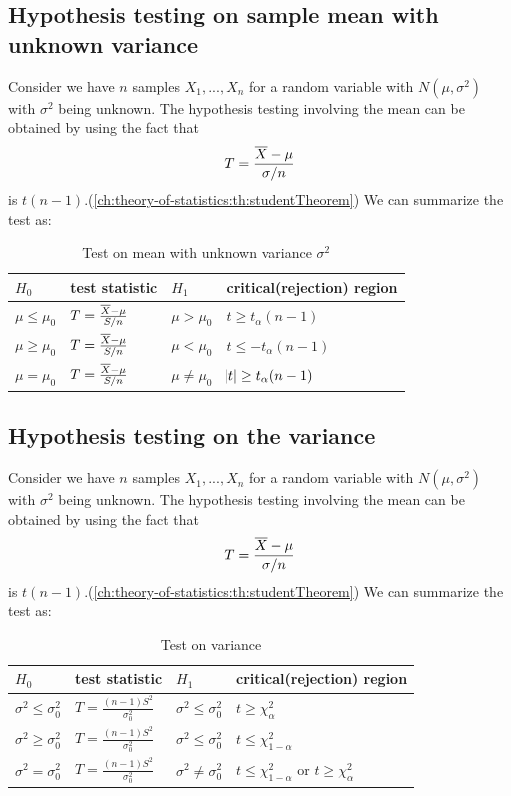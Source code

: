 \begin{refsection}
\subsection{Hypothesis testing on sample mean with unknown variance}
Consider we have $n$ samples $X_1,...,X_n$ for a random variable with $N(\mu,\sigma^2)$ with $\sigma^2$ being unknown. The hypothesis testing involving the mean can be obtained by using the fact that $$T = \frac{\overline{X} - \mu}{\sigma/n}$$ is $t(n-1)$.(\autoref{ch:theory-of-statistics:th:studentTheorem}) We can summarize the test as:
\begin{table}[H]
	\centering
	\caption{Test on mean with unknown variance $\sigma^2$}
	\begin{tabular}{|l|l|l|l|}
		\hline
		$H_0$	& test statistic  & $H_1$ & critical(rejection) region \\ \hline
		$\mu \leq \mu_0$ &$T = \frac{\overline{X} - \mu}{S/n}$ & $\mu > \mu_0$
		&  $t\geq t_\alpha(n-1)$ \\ \hline
		$\mu \geq \mu_0$ & $T = \frac{\overline{X} - \mu}{S/n}$ & $\mu < \mu_0$
		& $t\leq -t_\alpha(n-1)$ \\ \hline
		$\mu = \mu_0$ &  $T = \frac{\overline{X} - \mu}{S/n}$ & $\mu \neq \mu_0$
		&  $\abs{t}\geq t_\alpha(n-1)$\\ \hline
	\end{tabular}
\end{table}

\subsection{Hypothesis testing on the variance}
Consider we have $n$ samples $X_1,...,X_n$ for a random variable with $N(\mu,\sigma^2)$ with $\sigma^2$ being unknown. The hypothesis testing involving the mean can be obtained by using the fact that $$T = \frac{\overline{X} - \mu}{\sigma/n}$$ is $t(n-1)$.(\autoref{ch:theory-of-statistics:th:studentTheorem}) We can summarize the test as:
\begin{table}[H]
	\centering
	\caption{Test on variance }
	\begin{tabular}{|l|l|l|l|}
		\hline
		$H_0$	& test statistic  & $H_1$ & critical(rejection) region \\ \hline
		$\sigma^2 \leq \sigma_0^2$ &$T = \frac{(n-1)S^2}{\sigma_0^2}$ & $\sigma^2 \leq \sigma_0^2$
		&  $t \geq \chi^2_{\alpha}$ \\ \hline
		$\sigma^2 \geq \sigma_0^2$ & $T = \frac{(n-1)S^2}{\sigma_0^2}$ & $\sigma^2 \leq \sigma_0^2$
		& $t\leq \chi^2_{1-\alpha}$ \\ \hline
		$\sigma^2 = \sigma_0^2$ &  $T = \frac{(n-1)S^2}{\sigma_0^2}$ & $\sigma^2 \neq \sigma_0^2$
		&  $t\leq \chi^2_{1-\alpha}$ or $t \geq \chi^2_{\alpha}$\\ \hline
	\end{tabular}
\end{table}



\end{refsection}
